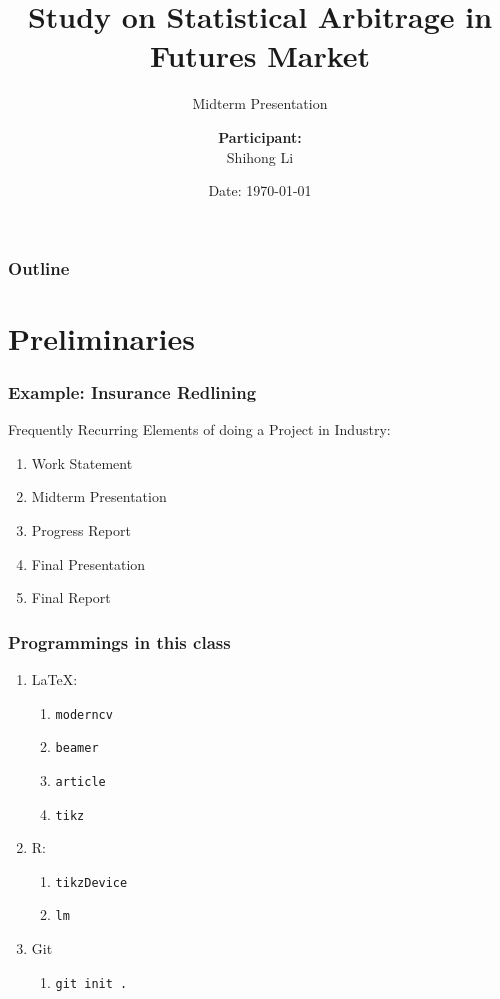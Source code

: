 \documentclass[compress,handout,10pt]{beamer}
\title{{\color{black} \LARGE Study on Statistical Arbitrage in Futures Market\newline} }
\subtitle{{\color{black} Midterm Presentation\large } }
\author{ 
    {\bf{Participant:}} \\ 
Shihong Li\\ 
    \vspace{5pt}
}
\institute{
{\bf{Sponsor:}}\\
Greenwoods Asset Management Ltd.\\
\vspace{5pt}
}
\date{\myblack Date: \today}
\let\olditem\item
\renewcommand{\item}{\setlength{\itemsep}{0.5\baselineskip}\olditem}
\begin{document}
\begin{frame}[plain]
    \titlepage
\end{frame}

\begin{frame}
    \frametitle{Outline}
    \tableofcontents
\end{frame}

\section{Preliminaries}

\begin{frame}
    \frametitle{Example: Insurance Redlining}
    Frequently Recurring Elements of doing a Project in Industry:
    \vspace{7pt}
             \begin{enumerate}
                 \item Work Statement
                 \item Midterm Presentation
                 \item Progress Report
                 \item Final Presentation
                 \item Final Report
             \end{enumerate}
\end{frame}

\begin{frame}
    \frametitle{Programmings in this class}
    \begin{enumerate}
        \item \LaTeX: 
            \begin{enumerate}
                \item \texttt{moderncv}
                \item \texttt{beamer}
                \item \texttt{article}
                \item \texttt{tikz}
            \end{enumerate}
        \item R:
            \begin{enumerate}
                \item \texttt{tikzDevice}
                \item \texttt{lm}
            \end{enumerate}
        \item Git
            \begin{enumerate}
                \item \texttt{git init .}
            \end{enumerate}
    \end{enumerate}
\end{frame}
\end{document}
